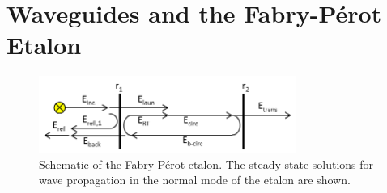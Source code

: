 \documentclass{report}
\begin{document}
    \section{Waveguides and the Fabry-P\'erot Etalon}
        \begin{figure}
            \centering
            \includegraphics[width=0.75\textwidth]{images/etalon_schematic.png}
            \caption{Schematic of the Fabry-P\'erot etalon. The steady state solutions for wave propagation in the normal mode of the etalon are shown.\cite{Ismail2016}}
            \label{fig:etalon}
        \end{figure}
\end{document}
